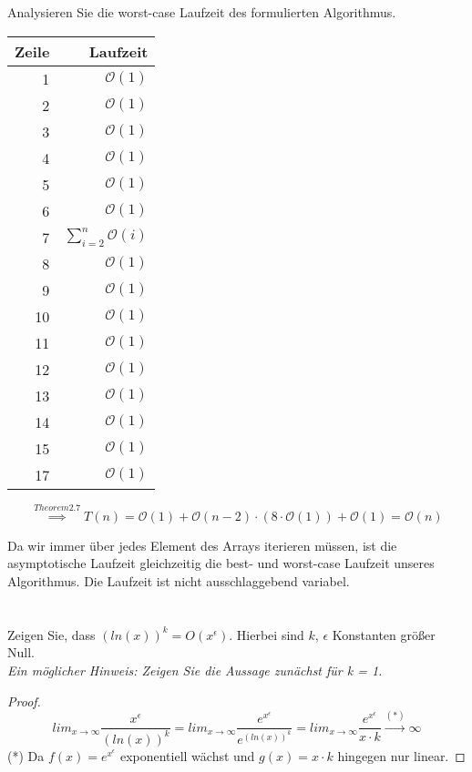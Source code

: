 \documentclass[12pt]{article}
\theoremstyle{remark}
\begin{document}
\subsection{} Analysieren Sie die worst-case Laufzeit des formulierten Algorithmus.

\begin{tabular}{r|r}
Zeile & Laufzeit \\ \hline
1  & $\mathcal{O}(1)$ \\
2  & $\mathcal{O}(1)$ \\
3  & $\mathcal{O}(1)$ \\
4  & $\mathcal{O}(1)$ \\
5  & $\mathcal{O}(1)$ \\
6  & $\mathcal{O}(1)$ \\
7  & $\sum_{i=2}^{n} \mathcal{O}(i)$ \\
8  & $\mathcal{O}(1)$ \\
9  & $\mathcal{O}(1)$ \\
10 & $\mathcal{O}(1)$ \\
11 & $\mathcal{O}(1)$ \\
12 & $\mathcal{O}(1)$ \\
13 & $\mathcal{O}(1)$ \\
14 & $\mathcal{O}(1)$ \\
15 & $\mathcal{O}(1)$ \\
17 & $\mathcal{O}(1)$ \\
\end{tabular}

\[
\stackrel{Theorem 2.7}{\implies} T(n) = \mathcal{O}(1) + \mathcal{O}(n-2) \cdot (8 \cdot \mathcal{O}(1))+ \mathcal{O}(1) = \mathcal{O}(n)
\]

Da wir immer über jedes Element des Arrays iterieren müssen, ist die asymptotische Laufzeit gleichzeitig die best- und worst-case Laufzeit unseres Algorithmus. Die Laufzeit ist nicht ausschlaggebend variabel.

\section{}

Zeigen Sie, dass $(ln(x))^k = O(x^\epsilon).$ Hierbei sind $k$, $\epsilon$ Konstanten größer Null. \\ {\it Ein möglicher Hinweis: Zeigen Sie die Aussage zunächst für k = 1.}

\begin{proof}
\[
lim_{x\rightarrow \infty}\frac{x^\epsilon}{(ln(x))^k} 
= lim_{x\rightarrow \infty}\frac{e^{x^\epsilon}}{e^{(ln(x))^k}} 
= lim_{x\rightarrow \infty}\frac{e^{x^\epsilon}}{x \cdot k}
\stackrel{(*)}{\rightarrow} \infty
\]
(*) Da $f(x) = e^{x^\epsilon}$ exponentiell wächst und $g(x)=x \cdot k$ hingegen nur linear.
\end{proof}
\end{document}
